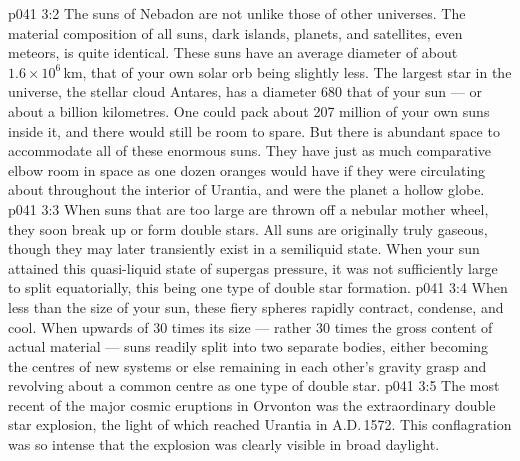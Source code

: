 \vs p041 3:2 The suns of Nebadon are not unlike those of other universes. The material composition of all suns, dark islands, planets, and satellites, even meteors, is quite identical. These suns have an average diameter of about $1.6\times 10^6$\,km, that of your own solar orb being slightly less. The largest star in the universe, the stellar cloud Antares, has a diameter 680 that of your sun --- or about a billion kilometres. One could pack about 207 million of your own suns inside it, and there would still be room to spare. But there is abundant space to accommodate all of these enormous suns. They have just as much comparative elbow room in space as one dozen oranges would have if they were circulating about throughout the interior of Urantia, and were the planet a hollow globe.
\vs p041 3:3 \pc When suns that are too large are thrown off a nebular mother wheel, they soon break up or form double stars. All suns are originally truly gaseous, though they may later transiently exist in a semiliquid state. When your sun attained this quasi\hyp{}liquid state of supergas pressure, it was not sufficiently large to split equatorially, this being one type of double star formation.
\vs p041 3:4 When less than  the size of your sun, these fiery spheres rapidly contract, condense, and cool. When upwards of 30 times its size --- rather 30 times the gross content of actual material --- suns readily split into two separate bodies, either becoming the centres of new systems or else remaining in each other’s gravity grasp and revolving about a common centre as one type of double star.
\vs p041 3:5 \pc The most recent of the major cosmic eruptions in Orvonton was the extraordinary double star explosion, the light of which reached Urantia in A.D.\,1572. This conflagration was so intense that the explosion was clearly visible in broad daylight.
